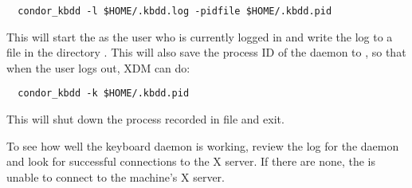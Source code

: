 \footnotesize
\begin{verbatim}
  condor_kbdd -l $HOME/.kbdd.log -pidfile $HOME/.kbdd.pid
\end{verbatim}
\normalsize

This will start the  as the user who is currently logged in
and write the log to a file in the directory 
.  
This will also save the process ID of the daemon 
to , 
so that when the user logs out, XDM can do:

\footnotesize
\begin{verbatim}
  condor_kbdd -k $HOME/.kbdd.pid
\end{verbatim}
\normalsize

This will shut down the process recorded in file  
and exit.

To see how well the keyboard daemon is working, review
the log for the daemon and look for successful connections to the X
server.  If there are none, the 
is unable to connect to the machine's X server.


